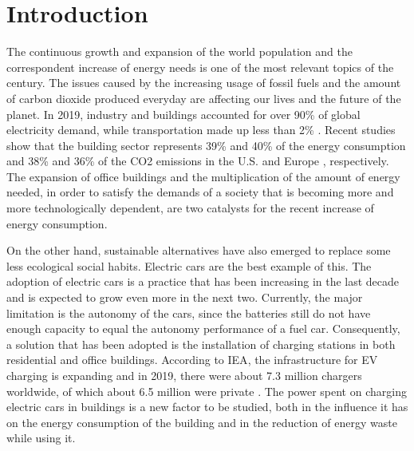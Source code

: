 \chapter{Introduction}
\label{chap:intro}

The continuous growth and expansion of the world population and the correspondent increase of energy needs is one of the most relevant topics of the century. The issues caused by the increasing usage of fossil fuels and the amount of carbon dioxide produced everyday are affecting our lives and the future of the planet. In 2019, industry and buildings accounted for over 90\% of global electricity demand, while transportation made up less than 2\% \cite{iea}. Recent studies show that the building sector represents 39\% and 40\% of the energy consumption and 38\% and 36\% of the CO2 emissions in the U.S. \cite{CivilUS} and Europe \cite{CivilEU}, respectively. The expansion of office buildings and the multiplication of the amount of energy needed, in order to satisfy the demands of a society that is becoming more and more technologically dependent, are two catalysts for the recent increase of energy consumption. 



On the other hand, sustainable alternatives have also emerged to replace some less ecological social habits. Electric cars are the best example of this. The adoption of electric cars is a practice that has been increasing in the last decade and is expected to grow even more in the next two. Currently, the major limitation is the autonomy of the cars, since the batteries still do not have enough capacity to equal the autonomy performance of a fuel car. Consequently, a solution that has been adopted is the installation of charging stations in both residential and office buildings. According to \ac{IEA}, the infrastructure for \ac{EV} charging is expanding and in 2019, there were about 7.3 million chargers worldwide, of which about 6.5 million were private \cite{charger}. The power spent on charging electric cars in buildings is a new factor to be studied, both in the influence it has on the energy consumption of the building and in the reduction of energy waste while using it.


